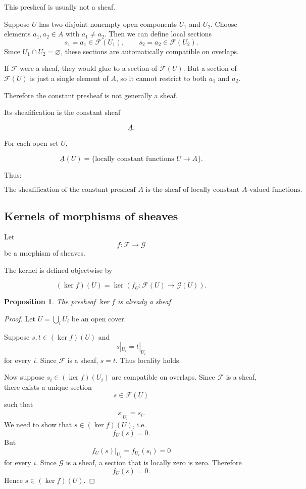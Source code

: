 \documentclass[12pt,a4paper]{article}
\newtheorem{proposition}{Proposition}[section]
\begin{document}
This presheaf is usually not a sheaf.

Suppose $U$ has two disjoint nonempty open components $U_1$ and $U_2$.
Choose elements $a_1,a_2 \in A$ with $a_1 \neq a_2$.
Then we can define local sections
\[
s_1=a_1 \in \mathcal F(U_1),
\qquad
s_2=a_2 \in \mathcal F(U_2).
\]
Since $U_1 \cap U_2=\varnothing$, these sections are automatically compatible
on overlaps.

If $\mathcal F$ were a sheaf, they would glue to a section of $\mathcal F(U)$.
But a section of $\mathcal F(U)$ is just a single element of $A$, so it cannot
restrict to both $a_1$ and $a_2$.

Therefore the constant presheaf is not generally a sheaf.

Its sheafification is the constant sheaf

\[
\underline{A}.
\]

For each open set $U$,

\[
\underline{A}(U)
=
\{
\text{locally constant functions } U \to A
\}.
\]

Thus:

\[
\boxed{
	\text{The sheafification of the constant presheaf } A
	\text{ is the sheaf of locally constant } A\text{-valued functions.}
}
\]

\subsection{Kernels of morphisms of sheaves}

Let
\[
f:\mathcal F \longrightarrow \mathcal G
\]
be a morphism of sheaves.

The kernel is defined objectwise by

\[
(\ker f)(U)
=
\ker
\left(
f_U:\mathcal F(U)\to\mathcal G(U)
\right).
\]

\begin{proposition}
	The presheaf $\ker f$ is already a sheaf.
\end{proposition}

\begin{proof}
	Let $U=\bigcup_i U_i$ be an open cover.
	
	Suppose $s,t \in (\ker f)(U)$ and
	\[
	s|_{U_i}=t|_{U_i}
	\]
	for every $i$.
	Since $\mathcal F$ is a sheaf, $s=t$.
	Thus locality holds.
	
	Now suppose $s_i \in (\ker f)(U_i)$ are compatible on overlaps.
	Since $\mathcal F$ is a sheaf, there exists a unique section
	\[
	s \in \mathcal F(U)
	\]
	such that
	\[
	s|_{U_i}=s_i.
	\]
	We need to show that $s \in (\ker f)(U)$, i.e.
	\[
	f_U(s)=0.
	\]
	But
	\[
	f_U(s)|_{U_i}
	=
	f_{U_i}(s_i)
	=
	0
	\]
	for every $i$.
	Since $\mathcal G$ is a sheaf, a section that is locally zero is zero.
	Therefore
	\[
	f_U(s)=0.
	\]
	Hence $s \in (\ker f)(U)$.
\end{proof}
\end{document}
